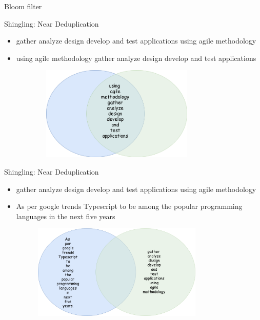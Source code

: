 \documentclass[9pt]{beamer}
\begin{document}
\begin{frame}{Bloom filter}
  
\end{frame}


\begin{frame}{Shingling: Near Deduplication}
  \pause
  \begin{itemize}
  \item gather analyze design develop and test applications using agile methodology
  \item using agile methodology gather analyze design develop and test applications
  \end{itemize}
  \pause
  \begin{figure}
    \centering
    \includegraphics[width=9.5cm,height=4.5cm]{img/bagofwords.png}
  \end{figure}
\end{frame}


\begin{frame}{Shingling: Near Deduplication}
  \begin{itemize}
  \item gather analyze design develop and test applications using agile methodology
  \item As per google trends Typescript to be among the popular programming languages in the next five years
  \end{itemize}
  \pause
  \begin{figure}
    \includegraphics[width=9.5cm,height=4.5cm]{img/bagofwordsintersect.png}
  \end{figure}
\end{frame}
\end{document}
